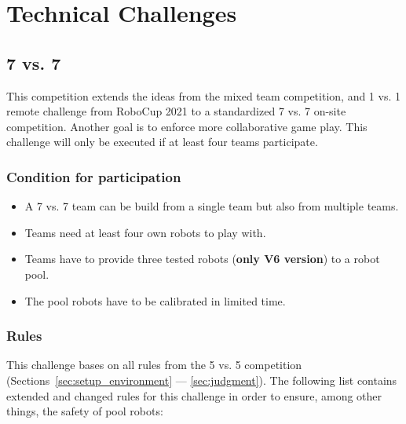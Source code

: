\section{Technical Challenges}

\subsection{7 vs. 7}
    This competition extends the ideas from the mixed team competition, and 1 vs. 1 remote challenge from RoboCup 2021 to a standardized 7 vs. 7 on-site competition. Another goal is to enforce more collaborative game play. This challenge will only be executed if at least four teams participate.

    \subsubsection{Condition for participation}
    \label{sec:7vs7:condition_for_participation}
        \begin{itemize}
            \item A 7 vs. 7 team can be build from a single team but also from multiple teams.
            \item Teams need at least four own robots to play with.
            \item Teams have to provide three tested robots (\textbf{only V6 version}) to a robot pool.
            \item The pool robots have to be calibrated in limited time.
        \end{itemize}

    \subsubsection{Rules}
        This challenge bases on all rules from the 5 vs. 5 competition (Sections~\ref{sec:setup_environment} — \ref{sec:judgment}). The following list contains extended and changed rules for this challenge in order to ensure, among other things, the safety of pool robots:

